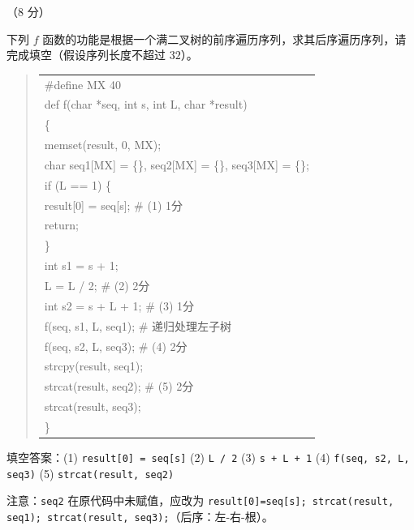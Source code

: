 \begin{question}[根据前序求后序]（8 分）

下列 $f$ 函数的功能是根据一个满二叉树的前序遍历序列，求其后序遍历序列，请完成填空（假设序列长度不超过 $32$）。

\begin{quote}
\footnotesize
\begin{tabular}{@{}l@{}}
\#define MX 40\\
def f(char *seq, int s, int L, char *result)\\
\{\\
    memset(result, 0, MX);\\
    char seq1[MX] = \{\}, seq2[MX] = \{\}, seq3[MX] = \{\};\\
    if (L == 1) \{\\
        result[0] = seq[s];                \# (1) 1分\\
        return;\\
    \}\\
    int s1 = s + 1;\\
    L = L / 2;                             \# (2) 2分\\
    int s2 = s + L + 1;                    \# (3) 1分\\
    f(seq, s1, L, seq1);                   \# 递归处理左子树\\
    f(seq, s2, L, seq3);                   \# (4) 2分\\
    strcpy(result, seq1);\\
    strcat(result, seq2);                  \# (5) 2分\\
    strcat(result, seq3);\\
\}\\
\end{tabular}
\end{quote}

\begin{solution}
填空答案：(1) \texttt{result[0] = seq[s]} (2) \texttt{L / 2} (3) \texttt{s + L + 1} (4) \texttt{f(seq, s2, L, seq3)} (5) \texttt{strcat(result, seq2)}

注意：\texttt{seq2} 在原代码中未赋值，应改为 \texttt{result[0]=seq[s]; strcat(result, seq1); strcat(result, seq3);}（后序：左-右-根）。
\end{solution}
\end{question}


